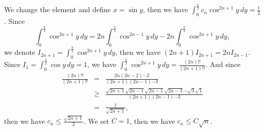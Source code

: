 \documentclass[12pt,a4paper]{ctexart}
\begin{document}
We change the element and define $x = \sin y$, then we have $\int_{0}^{\frac{\pi}{2}}  c_{n} \cos^{2n+1}y \, d y = \frac{1}{2}$. Since 
\begin{equation*}
   \int_{0}^{\frac{\pi}{2}} \cos^{2n+1}y \, d y = 2n \int_{0}^{\frac{\pi}{2}} \cos^{2n-1}y \, d y - 2n \int_{0}^{\frac{\pi}{2}} \cos^{2n+1}y \, d y,
\end{equation*}
we denote $I_{2n + 1} = \int_{0}^{\frac{\pi}{2}} \cos^{2n+1}y \, d y$, then we have $(2n + 1)I_{2n+1} = 2n I_{2n-1}$. Since $I_{1} = \int_{0}^{\frac{\pi}{2}} \cos y \, d y = 1$, we have $\int_{0}^{\frac{\pi}{2}} \cos^{2n+1}y \, d y = \frac{(2n)!!}{(2n+1)!!}$. And since
\begin{eqnarray*}
\frac{(2n)!!}{(2n+1)!!} &=&  \frac{2n (2n-2) \cdots 2}{(2n+1) (2n-1) \cdots 3}  \\
            &\geq& \frac{\sqrt{2n+1}\sqrt{2n-1}\sqrt{2n-1}\sqrt{2n-3} \cdots \sqrt{3}\sqrt{1}}{(2n+1) (2n-1) \cdots 3} \\
            &=& \frac{1}{\sqrt{2n+1}},
\end{eqnarray*}
then we have $c_{n} \leq \frac{\sqrt{2n+1}}{2}$. We set $C = 1$, then we have $c_{n} \leq C \sqrt{n}$.
\end{document}
